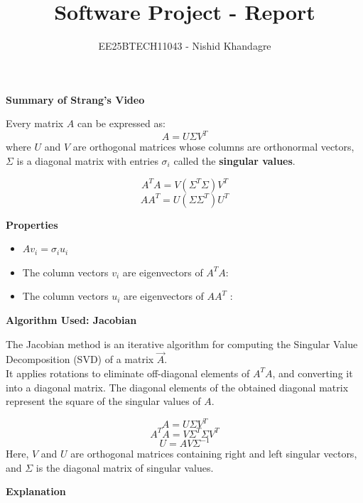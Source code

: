 \documentclass[journal]{IEEEtran}
\title{Software Project - Report}
\author{EE25BTECH11043 - Nishid Khandagre}
\begin{document}
\maketitle

\renewcommand{\thefigure}{\theenumi}
\renewcommand{\thetable}{\theenumi}

\textbf{Summary of Strang's Video}


Every matrix $A$ can be expressed as:
\[
A = U \Sigma V^T
\]
where $U$ and $V$ are orthogonal matrices whose columns are orthonormal vectors,\\
$\Sigma$ is a diagonal matrix with entries $\sigma_i$ called the \textbf{singular values}.

\[
A^T A = V (\Sigma^T \Sigma) V^T
\]
\[
A A^T = U (\Sigma \Sigma^T) U^T
\]


\textbf{Properties}
\begin{itemize}
    \item $A v_i = \sigma_i u_i$
    \item The column vectors $v_i$ are eigenvectors of $A^T A$:
    \item The column vectors $u_i$ are eigenvectors of $A A^T$ :
\end{itemize}

\textbf{Algorithm Used: Jacobian}


The Jacobian method is an iterative algorithm for computing the Singular Value Decomposition (SVD) of a matrix $\vec{A}$.\\
It applies rotations to eliminate off-diagonal elements of \(A^T A \), and converting it into a diagonal matrix. The diagonal elements of the obtained diagonal matrix represent the square of the singular values of \( A \).


\[
A=U \Sigma V^T
\]
\[
A^T A = V \Sigma^T\Sigma V^T
\]
\[
U = A V \Sigma^{-1}
\]
Here, \( V \) and \( U \) are orthogonal matrices containing right and left singular vectors, and \( \Sigma \) is the diagonal matrix of singular values.

\textbf{Explanation}
\end{document}
